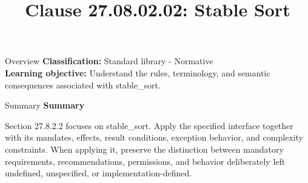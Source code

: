 \documentclass[10pt,letterpaper]{article}
\title{Clause 27.08.02.02: Stable Sort}
\author{}
\date{}
\begin{document}
\maketitle
\begin{CornellOverviewBox}{Overview}
\textbf{Classification:} Standard library - Normative\\[2pt]
\textbf{Learning objective:} Understand the rules, terminology, and semantic consequences associated with stable\_sort.
\end{CornellOverviewBox}\begin{CornellSummaryBox}{Summary}
{\sffamily\bfseries\color{Accent} Summary}\par\vspace{3pt}Section 27.8.2.2 focuses on stable\_sort. Apply the specified interface together with its mandates, effects, result conditions, exception behavior, and complexity constraints. When applying it, preserve the distinction between mandatory requirements, recommendations, permissions, and behavior deliberately left undefined, unspecified, or implementation-defined.
\end{CornellSummaryBox}
\end{document}
